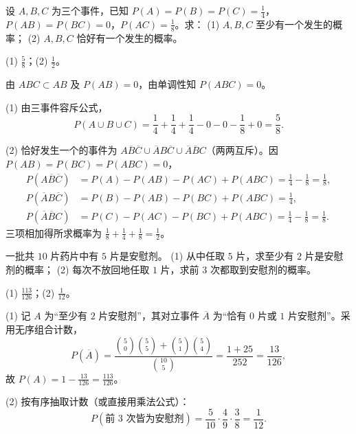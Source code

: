 \begin{exercise}[title={概率的加法公式与对立事件},level=basic,points=6,tags={概率性质,容斥公式}]
设 $A,B,C$ 为三个事件，已知 $P(A)=P(B)=P(C)=\frac{1}{4}$，$P(AB)=P(BC)=0$，$P(AC)=\frac{1}{8}$。求：
(1) $A,B,C$ 至少有一个发生的概率；
(2) $A,B,C$ 恰好有一个发生的概率。
\begin{answer}
(1) $\frac{5}{8}$；(2) $\frac{1}{2}$。
\end{answer}
\begin{solution}
由 $ABC\subset AB$ 及 $P(AB)=0$，由单调性知 $P(ABC)=0$。

(1) 由三事件容斥公式，
\[
  P(A\cup B\cup C)=\frac{1}{4}+\frac{1}{4}+\frac{1}{4}-0-0-\frac{1}{8}+0=\frac{5}{8}.
\]

(2) 恰好发生一个的事件为 $A\overline{B}\overline{C}\cup\overline{A}B\overline{C}\cup\overline{A}\overline{B}C$（两两互斥）。因 $P(AB)=P(BC)=P(ABC)=0$，
\[
\begin{aligned}
  P(A\overline{B}\overline{C})&=P(A)-P(AB)-P(AC)+P(ABC)=\frac{1}{4}-\frac{1}{8}=\frac{1}{8},\\
  P(\overline{A}B\overline{C})&=P(B)-P(AB)-P(BC)+P(ABC)=\frac{1}{4},\\
  P(\overline{A}\overline{B}C)&=P(C)-P(AC)-P(BC)+P(ABC)=\frac{1}{4}-\frac{1}{8}=\frac{1}{8}.
\end{aligned}
\]
三项相加得所求概率为 $\frac{1}{8}+\frac{1}{4}+\frac{1}{8}=\frac{1}{2}$。
\end{solution}
\end{exercise}

\begin{exercise}[title={超几何抽样},level=basic,points=6,tags={古典概型,超几何}]
一批共 $10$ 片药片中有 $5$ 片是安慰剂。
(1) 从中任取 $5$ 片，求至少有 $2$ 片是安慰剂的概率；
(2) 每次不放回地任取 $1$ 片，求前 $3$ 次都取到安慰剂的概率。
\begin{answer}
(1) $\frac{113}{126}$；(2) $\frac{1}{12}$。
\end{answer}
\begin{solution}
(1) 记 $A$ 为“至少有 $2$ 片安慰剂”，其对立事件 $\overline{A}$ 为“恰有 $0$ 片或 $1$ 片安慰剂”。采用无序组合计数，
\[
  P(\overline{A})=\frac{\binom{5}{0}\binom{5}{5}+\binom{5}{1}\binom{5}{4}}{\binom{10}{5}}
  =\frac{1+25}{252}=\frac{13}{126},
\]
故 $P(A)=1-\frac{13}{126}=\frac{113}{126}$。

(2) 按有序抽取计数（或直接用乘法公式）：
\[
  P(\text{前 }3\text{ 次皆为安慰剂})
  =\frac{5}{10}\cdot\frac{4}{9}\cdot\frac{3}{8}=\frac{1}{12}.
\]
\end{solution}
\end{exercise}

